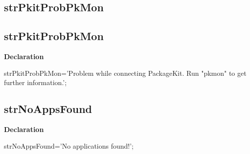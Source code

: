 \documentclass{report}
\newif\ifpdf
\begin{document}
\subsection*{\large{\textbf{strPkitProbPkMon}}\normalsize\hspace{1ex}\hrulefill}
\else
\subsection*{strPkitProbPkMon}
\fi
\label{trstrings-strPkitProbPkMon}
\begin{list}{}{
\setlength{\itemindent}{0cm}
\setlength{\listparindent}{0cm}
\setlength{\leftmargin}{\evensidemargin}
\addtolength{\leftmargin}{\tmplength}
\settowidth{\labelsep}{X}
\addtolength{\leftmargin}{\labelsep}
\setlength{\labelwidth}{\tmplength}
}
\item[\textbf{Declaration}\hfill]
\ifpdf
\begin{flushleft}
\fi
\begin{ttfamily}
strPkitProbPkMon='Problem while connecting PackageKit. Run "pkmon" to get further information.';\end{ttfamily}

\ifpdf
\end{flushleft}
\fi

\end{list}
\ifpdf
\subsection*{\large{\textbf{strNoAppsFound}}\normalsize\hspace{1ex}\hrulefill}
\else
\subsection*{strNoAppsFound}
\fi
\label{trstrings-strNoAppsFound}
\begin{list}{}{
\setlength{\itemindent}{0cm}
\setlength{\listparindent}{0cm}
\setlength{\leftmargin}{\evensidemargin}
\addtolength{\leftmargin}{\tmplength}
\settowidth{\labelsep}{X}
\addtolength{\leftmargin}{\labelsep}
\setlength{\labelwidth}{\tmplength}
}
\item[\textbf{Declaration}\hfill]
\ifpdf
\begin{flushleft}
\fi
\begin{ttfamily}
strNoAppsFound='No applications found!';\end{ttfamily}

\ifpdf
\end{flushleft}
\fi

\end{list}
\ifpdf
\end{document}
